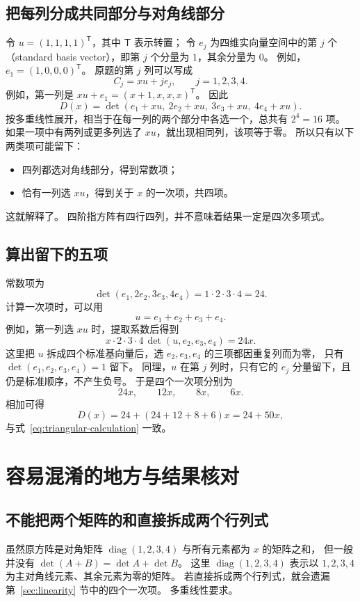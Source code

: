 \documentclass[UTF8,12pt,a4paper,fontset=fandol]{ctexart}
\begin{document}
\subsection{把每列分成共同部分与对角线部分}

令 $u=(1,1,1,1)^{\mathsf T}$，其中 $\mathsf T$ 表示转置；
令 $e_j$ 为四维实向量空间中的第 $j$ 个（standard basis vector），即第 $j$ 个分量为 $1$，其余分量为 $0$。
例如，$e_1=(1,0,0,0)^{\mathsf T}$。
原题的第 $j$ 列可以写成
\[
  C_j=xu+je_j,\qquad j=1,2,3,4.
\]
例如，第一列是 $xu+e_1=(x+1,x,x,x)^{\mathsf T}$。
因此
\[
  D(x)=\det(e_1+xu,\ 2e_2+xu,\ 3e_3+xu,\ 4e_4+xu).
\]
按多重线性展开，相当于在每一列的两个部分中各选一个，总共有 $2^4=16$ 项。
如果一项中有两列或更多列选了 $xu$，就出现相同列，该项等于零。
所以只有以下两类项可能留下：
\begin{itemize}
  \item 四列都选对角线部分，得到常数项；
  \item 恰有一列选 $xu$，得到关于 $x$ 的一次项，共四项。
\end{itemize}
这就解释了。
四阶指方阵有四行四列，并不意味着结果一定是四次多项式。

\subsection{算出留下的五项}

常数项为
\[
  \det(e_1,2e_2,3e_3,4e_4)=1\cdot2\cdot3\cdot4=24.
\]
计算一次项时，可以用
\[
  u=e_1+e_2+e_3+e_4.
\]
例如，第一列选 $xu$ 时，提取系数后得到
\[
  x\cdot2\cdot3\cdot4\,\det(u,e_2,e_3,e_4)=24x.
\]
这里把 $u$ 拆成四个标准基向量后，选 $e_2,e_3,e_4$ 的三项都因重复列而为零，
只有 $\det(e_1,e_2,e_3,e_4)=1$ 留下。
同理，$u$ 在第 $j$ 列时，只有它的 $e_j$ 分量留下，且仍是标准顺序，不产生负号。
于是四个一次项分别为
\[
  24x,\qquad12x,\qquad8x,\qquad6x.
\]
相加可得
\[
  D(x)=24+(24+12+8+6)x=24+50x,
\]
与式~\eqref{eq:triangular-calculation} 一致。

\section{容易混淆的地方与结果核对}

\subsection{不能把两个矩阵的和直接拆成两个行列式}

虽然原方阵是对角矩阵 $\operatorname{diag}(1,2,3,4)$ 与所有元素都为 $x$ 的矩阵之和，
但一般并没有 $\det(A+B)=\det A+\det B$。
这里 $\operatorname{diag}(1,2,3,4)$ 表示以 $1,2,3,4$ 为主对角线元素、其余元素为零的矩阵。
若直接拆成两个行列式，就会遗漏第~\ref{sec:linearity} 节中的四个一次项。
多重线性要求。
\end{document}
